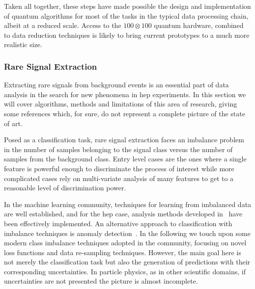 Taken all together, these  steps  have made possible the design and implementation of quantum algorithms for most of the tasks in the typical data processing chain, albeit at a reduced scale. Access to the $100 \otimes 100$ quantum hardware, combined to data reduction techniques is likely to bring current prototypes to a much more realistic size.

\subsubsection{Rare Signal Extraction}
Extracting rare signals from background events is an essential part of data analysis in the search for new phenomena in \gls{hep} experiments. In this section we will cover algorithms, methods and limitations of this area of research, giving some references which, for sure, do not represent a complete picture of the state of art.

Posed as a classification task, rare signal extraction faces an imbalance problem in the number of samples belonging to the signal class versus the number of samples from the background class.
Entry level cases are the ones where a single feature is powerful enough to discriminate the process of interest while more complicated cases rely on multi-variate analysis of many features to get to a reasonable level of discrimination power.

In the machine learning community, techniques for learning from imbalanced data are well established, and for the \gls{hep} case, analysis methods developed in~\cite{Britsch:2008mxb, extr_imb} have been effectively implemented. An alternative approach to classification with imbalance techniques is anomaly detection~\cite{Edelen:2021vcs,anoma2}.
In the following we touch upon some modern class imbalance techniques adopted in the community, focusing on novel loss functions and data re-sampling techniques.
However, the main goal here is not merely the classification task but also the generation of predictions with their corresponding uncertainties. In particle physics, as in other scientific domains, if uncertainties are not presented the picture is almost incomplete.

